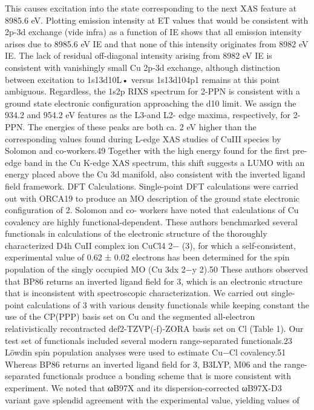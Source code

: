 This causes excitation into the state corresponding to the next
XAS feature at 8985.6 eV. Plotting emission intensity at ET
values that would be consistent with 2p-3d exchange (vide
infra) as a function of IE shows that all emission intensity arises
due to 8985.6 eV IE and that none of this intensity originates
from 8982 eV IE. The lack of residual oﬀ-diagonal intensity
arising from 8982 eV IE is consistent with vanishingly small Cu
2p-3d exchange, although distinction between excitation to
1s13d10L• versus 1s13d104p1 remains at this point ambiguous.
Regardless, the 1s2p RIXS spectrum for 2-PPN is consistent
with a ground state electronic conﬁguration approaching the
d10 limit.
We assign the 934.2 and 954.2 eV features as the L3-and L2-
edge maxima, respectively, for 2-PPN. The energies of these
peaks are both ca. 2 eV higher than the corresponding values
found during L-edge XAS studies of CuIII species by Solomon
and co-workers.49 Together with the high energy found for the
ﬁrst pre-edge band in the Cu K-edge XAS spectrum, this shift
suggests a LUMO with an energy placed above the Cu 3d
manifold, also consistent with the inverted ligand ﬁeld
framework.
DFT Calculations. Single-point DFT calculations were
carried out with ORCA19 to produce an MO description of the
ground state electronic conﬁguration of 2. Solomon and co-
workers have noted that calculations of Cu covalency are highly
functional-dependent. These authors benchmarked several
functionals in calculations of the electronic structure of the
thoroughly characterized D4h CuII complex ion CuCl4
2− (3), for
which a self-consistent, experimental value of 0.62 ± 0.02
electrons has been determined for the spin population of the
singly occupied MO (Cu 3dx
2−y
2).50 These authors observed
that BP86 returns an inverted ligand ﬁeld for 3, which is an
electronic structure that is inconsistent with spectroscopic
characterization.
We carried out single-point calculations of 3 with various
density functionals while keeping constant the use of the
CP(PPP) basis set on Cu and the segmented all-electron
relativistically recontracted def2-TZVP(-f)-ZORA basis set on
Cl (Table 1). Our test set of functionals included several
modern range-separated functionals.23 Löwdin spin population
analyses were used to estimate Cu−Cl covalency.51 Whereas
BP86 returns an inverted ligand ﬁeld for 3, B3LYP, M06 and
the range-separated functionals produce a bonding scheme that
is more consistent with experiment. We noted that ωB97X and
its dispersion-corrected ωB97X-D3 variant gave splendid
agreement with the experimental value, yielding values of
